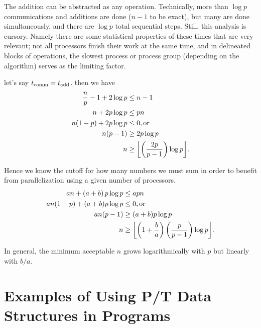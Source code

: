 The addition can be abstracted as any operation. Technically, more than
$\log{p}$ communications and additions are done ($n-1$ to be exact), but many
are done simultaneously, and there are $\log{p}$ total sequential steps. Still,
this analysis is cursory. Namely there are some statistical properties of these
times that are very relevant; not all processors finish their work at the same
time, and in delineated blocks of operations, the slowest process or process
group (depending on the algorithm) serves as the limiting factor.

let's say $t_\mathrm{comm} = t_\mathrm{add}$. then we have
\begin{align*}
\frac{n}{p} - 1 + 2\log{p}  &\leq n-1                   \\
n + 2p\log{p}               &\leq pn                    \\
n(1 - p) + 2p\log{p}        &\leq 0 \mathrm{, or}       \\
n(p - 1)                    &\geq 2p\log{p}             \\
n                           &\geq \floor*{\left(\frac{2p}{p-1}\right)\log{p}}.
\end{align*}

Hence we know the cutoff for how many numbers we must sum in order to benefit
from parallelization using a given number of processors. 
\begin{align*}
an + \left(a+b\right)p\log{p}   &\leq apn              \\
an(1 - p) + (a+b)p\log{p}       &\leq 0 \mathrm{, or}  \\
an(p - 1)                       &\geq (a+b)p\log{p}    \\
n &\geq \floor*{\left(1 + \frac{b}{a}\right)\left(\frac{p}{p-1}\right)\log{p}}.
\end{align*}

In general, the minimum acceptable $n$ grows logarithmically with $p$ but linearly
with $b/a$.

\section{Examples of Using P/T Data Structures in Programs}

